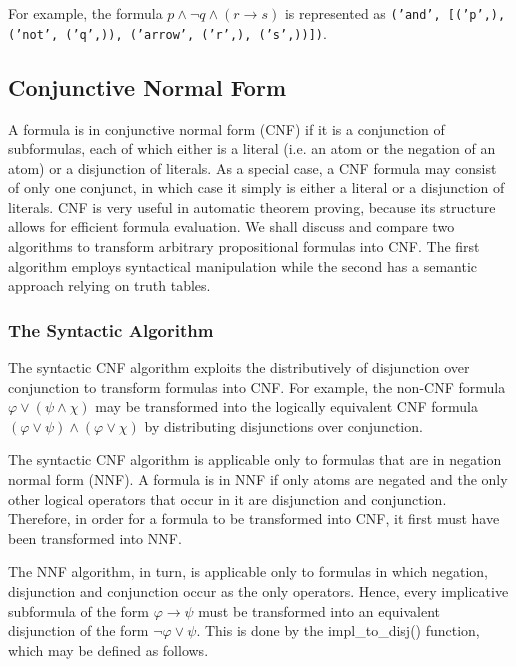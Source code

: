 \documentclass[a4paper,notitlepage]{scrartcl}
\let\phi\varphi
\begin{document}
\noindent
For example, the formula $p \land \lnot q \land (r \to s)$ is represented as
\texttt{('and', [('p',), ('not', ('q',)), ('arrow', ('r',), ('s',))])}.


\subsection{Conjunctive Normal Form}

A formula is in conjunctive normal form (CNF) if it is a conjunction of
subformulas, each of which either is a literal (i.e. an atom or the negation of
an atom) or a disjunction of literals.
As a special case, a CNF formula may consist of only one conjunct, in which
case it simply is either a literal or a disjunction of literals. 
CNF is very useful in automatic theorem proving, because its structure allows
for efficient formula evaluation.
We shall discuss and compare two algorithms to transform arbitrary
propositional formulas into CNF.
The first algorithm employs syntactical manipulation while the second has a
semantic approach relying on truth tables.

\subsubsection{The Syntactic Algorithm}

The syntactic CNF algorithm exploits the distributively of disjunction over
conjunction to transform formulas into CNF.
For example, the non-CNF formula $\phi \lor (\psi \land \chi)$ may be
transformed into the logically equivalent CNF formula $(\phi \lor \psi) \land
(\phi \lor \chi)$ by distributing disjunctions over conjunction.

The syntactic CNF algorithm is applicable only to formulas that are in negation
normal form (NNF).
A formula is in NNF if only atoms are negated and the only other logical
operators that occur in it are disjunction and conjunction.
Therefore, in order for a formula to be transformed into CNF, it first must
have been transformed into NNF.

The NNF algorithm, in turn, is applicable only to formulas in which negation,
disjunction and conjunction occur as the only operators.
Hence, every implicative subformula of the form $\phi \to \psi$ must be
transformed into an equivalent disjunction of the form $\lnot\phi \lor \psi$.
This is done by the impl\_to\_disj() function, which may be defined as follows.
\end{document}
